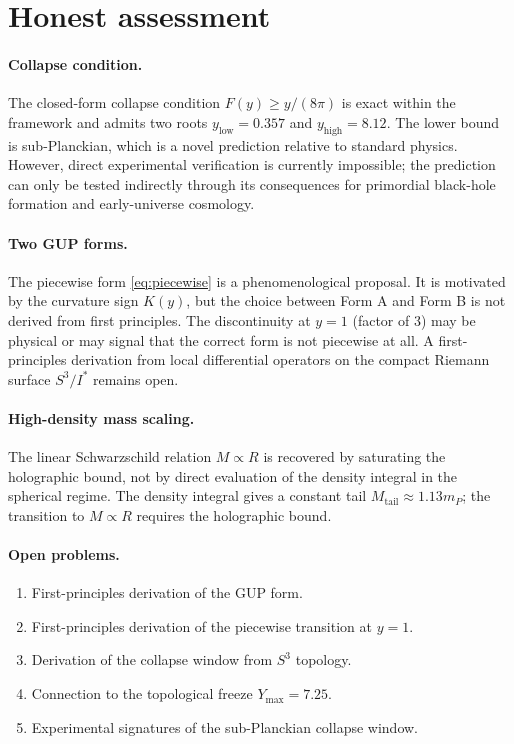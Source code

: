 \documentclass[12pt,oneside,openany]{book}
\begin{document}
\section{Honest assessment}

\paragraph{Collapse condition.}
The closed-form collapse condition $F(y)\geq y/(8\pi)$ is exact
within the framework and admits two roots $y_{\text{low}}=0.357$
and $y_{\text{high}}=8.12$. The lower bound is sub-Planckian,
which is a novel prediction relative to standard physics.
However, direct experimental verification is currently
impossible; the prediction can only be tested indirectly
through its consequences for primordial black-hole formation
and early-universe cosmology.

\paragraph{Two GUP forms.}
The piecewise form \eqref{eq:piecewise} is a phenomenological
proposal. It is motivated by the curvature sign $K(y)$, but the
choice between Form A and Form B is not derived from first
principles. The discontinuity at $y=1$ (factor of $3$) may be
physical or may signal that the correct form is not piecewise
at all. A first-principles derivation from local differential
operators on the compact Riemann surface $S^{3}/I^{*}$ remains
open.

\paragraph{High-density mass scaling.}
The linear Schwarzschild relation $M\propto R$ is recovered by
saturating the holographic bound, not by direct evaluation of
the density integral in the spherical regime. The density
integral gives a constant tail $M_{\text{tail}}\approx
1.13 m_{P}$; the transition to $M\propto R$ requires the
holographic bound.

\paragraph{Open problems.}
\begin{enumerate}
\item First-principles derivation of the GUP form.
\item First-principles derivation of the piecewise transition
at $y=1$.
\item Derivation of the collapse window from $S^{3}$ topology.
\item Connection to the topological freeze $Y_{\max}=7.25$.
\item Experimental signatures of the sub-Planckian collapse
window.
\end{enumerate}
\end{document}
